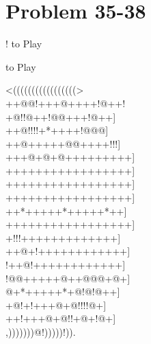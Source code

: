 \documentclass[mcrownvopaper,10pt,onecolumn,final]{memoir}
\begin{document}
\section{Problem 35-38}
\begin{minipage}[c]{0.5\linewidth}
    \hspace{8.3mm} {\gnos%
        !
    }
    to Play
\end{minipage}
\begin{minipage}[c]{0.5\linewidth}
    \hspace{27mm}{\gnos%
        @
    }
    to Play
\end{minipage}
\begin{minipage}[c]{\linewidth}
    \centering
    {\gnos%
          <(((((((((((((((((>\\
    ++@@!+++@++++!@++!\\
    +@!!@++!@@+++!@++]\\
    ++@!!!!+*++++!@@@]\\
    ++@+++++@@++++!!!]\\
    +++@+@+@+++++++++]\\
    +++++++++++++++++]\\
    +++++++++++++++++]\\
    +++++++++++++++++]\\
    ++*+++++*+++++*++]\\
    +++++++++++++++++]\\
    +!!!+++++++++++++]\\
    ++@+!++++++++++++]\\
    !++@!++++++++++++]\\
    !@@+++++@++@@@+@+]\\
    @+*+++++*+@!@!@++]\\
    +@!+!+++@+@!!!!@+]\\
    ++!+++@+@!!+@+!@+]\\
          ,)))))))@!)))))!)).\\
    }
\end{minipage}
\newpage
\end{document}
